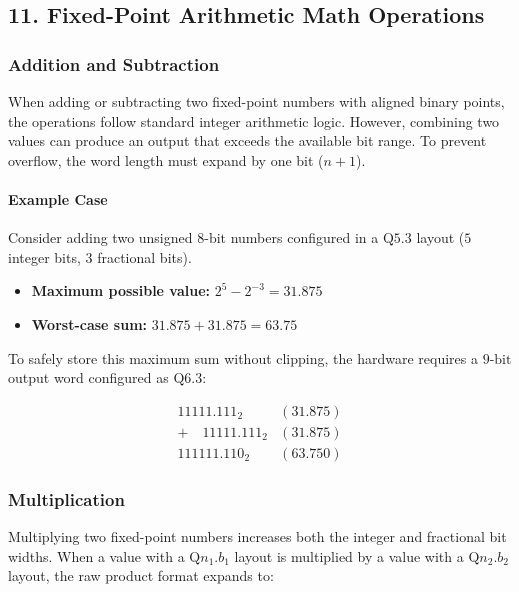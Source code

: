 \documentclass[
]{article}
\providecommand{\tightlist}{%
  \setlength{\itemsep}{0pt}\setlength{\parskip}{0pt}}
\begin{document}
\subsection{11. Fixed-Point Arithmetic Math
Operations}\label{fixed-point-arithmetic-math-operations}

\subsubsection{Addition and Subtraction}\label{addition-and-subtraction}

When adding or subtracting two fixed-point numbers with aligned binary
points, the operations follow standard integer arithmetic logic.
However, combining two values can produce an output that exceeds the
available bit range. To prevent overflow, the word length must expand by
one bit (\(n + 1\)).

\paragraph{Example Case}\label{example-case}

Consider adding two unsigned \(8\text{-bit}\) numbers configured in a
\(\text{Q}5.3\) layout (\(5\) integer bits, \(3\) fractional bits).

\begin{itemize}
\tightlist
\item
  \textbf{Maximum possible value:} \(2^5 - 2^{-3} = 31.875\)
\item
  \textbf{Worst-case sum:} \(31.875 + 31.875 = 63.75\)
\end{itemize}

To safely store this maximum sum without clipping, the hardware requires
a \(9\text{-bit}\) output word configured as \(\text{Q}6.3\):

\[\begin{array}{rrc}
11111.111_2 & (31.875) \\
+\quad 11111.111_2 & (31.875) \\
\hline
111111.110_2 & (63.750)
\end{array}\]

\subsubsection{Multiplication}\label{multiplication}

Multiplying two fixed-point numbers increases both the integer and
fractional bit widths. When a value with a \(\text{Q}n_1.b_1\) layout is
multiplied by a value with a \(\text{Q}n_2.b_2\) layout, the raw product
format expands to:
\end{document}
